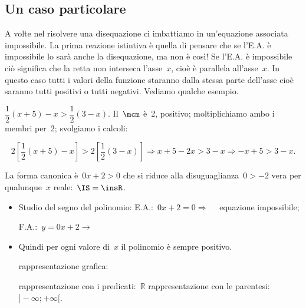 \subsection{Un caso particolare}

A volte nel risolvere una disequazione ci imbattiamo in un'equazione associata 
impossibile. La prima reazione istintiva è quella di pensare che se l'E.A. è 
impossibile lo sarà anche la disequazione, ma non è così! 
Se l'E.A. è impossibile ciò significa che la retta non interseca l'asse~$x$, 
cioè è parallela all'asse~$x$. In questo caso tutti i valori della funzione 
staranno dalla stessa parte dell'asse cioè saranno tutti positivi o tutti 
negativi. Vediamo qualche esempio.

\begin{exrig}

\begin{esempio}
$\dfrac{1}{2} (x+5)-x>\dfrac{1}{2} (3-x).$
Il~$\mcm$ è~2, positivo; moltiplichiamo ambo i membri per~2; svolgiamo
i calcoli:

\[2 \left[\frac{1}{2}(x+5)-x\right]>2
\left[\frac{1}{2}(3-x)\right]\Rightarrow x+5-2x>3-x\Rightarrow -x+5>3-x.\]

La forma canonica è~$0 x + 2 > 0$ che si riduce alla disuguaglianza~$0>-2$
vera per qualunque~$x$ reale:~$\IS=\insR$.
\begin{itemize}
 \item Studio del segno del polinomio:
 \subitem E.A.:~$0 x + 2 = 0  \Rightarrow \quad $ equazione impossibile;
 \subitem
  \begin{minipage}{.25\textwidth}
   F.A.:~$y=0 x + 2 \rightarrow $
  \end{minipage}
  \begin{minipage}{.30\textwidth}
  
  \end{minipage}
 \item Quindi per ogni valore di~$x$ il polinomio è sempre positivo. 
 \subitem 
  \begin{minipage}{.35\textwidth}
   rappresentazione grafica: 
  \end{minipage}
  \begin{minipage}{.30\textwidth}
   
  \end{minipage}
 \subitem rappresentazione con i predicati:~$\mathbb{R}$ 
 \subitem rappresentazione con le parentesi:~$]-\infty; +\infty[$. 
\end{itemize}
\end{esempio}



\end{exrig}
